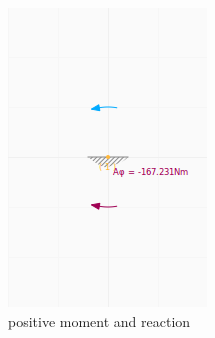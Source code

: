 \documentclass[a4paper,11pt]{report}
\begin{document}
\begin{minipage}[h]{0.3\textwidth}
\begin{figure}[H]
\begin{center}
\includegraphics[width=\textwidth]{../pictures/reactionmoment.png}
\caption{positive moment and reaction}
\label{pic:reactionmoment}
\end{center}
\end{figure}
\end{minipage}
\hfill
\end{document}
